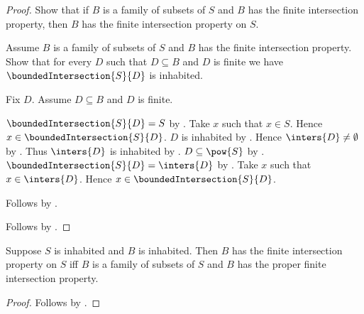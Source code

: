 \begin{proof}
    Show that if $B$ is a family of subsets of $S$ and
        $B$ has the finite intersection property, then
        $B$ has the finite intersection property on $S$.
    \begin{subproof}
        Assume $B$ is a family of subsets of $S$ and
            $B$ has the finite intersection property.
        Show that for every $D$ such that $D\subseteq B$ and $D$ is finite
            we have $\boundedIntersection{S}{D}$ is inhabited.
        \begin{subproof}
            Fix $D$.
            Assume $D\subseteq B$ and $D$ is finite.
            \begin{byCase}
                $\boundedIntersection{S}{D}=S$ by
                    .
                Take $x$ such that $x\in S$.
                Hence $x\in\boundedIntersection{S}{D}$.
                $D$ is inhabited by .
                Hence $\inters{D}\neq\emptyset$ by
                    .
                Thus $\inters{D}$ is inhabited by
                    .
                $D\subseteq\pow{S}$ by
                    .
                $\boundedIntersection{S}{D}=\inters{D}$ by
                    .
                Take $x$ such that $x\in\inters{D}$.
                Hence $x\in\boundedIntersection{S}{D}$.
            \end{byCase}
        \end{subproof}
        Follows by .
    \end{subproof}
    Follows by \auto.
\end{proof}

\begin{corollary}\label{hosted_fip_iff_proper_ambient_free_fip}
    Suppose $S$ is inhabited and $B$ is inhabited.
    Then $B$ has the finite intersection property on $S$ iff
        $B$ is a family of subsets of $S$ and
        $B$ has the proper finite intersection property.
\end{corollary}
\begin{proof}
    Follows by
        .
\end{proof}
